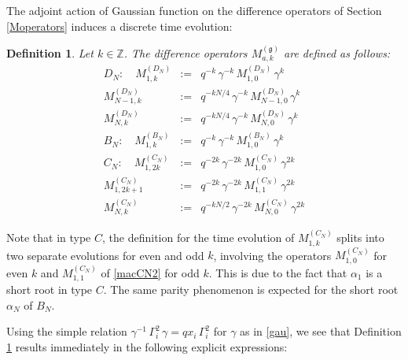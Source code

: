 \documentclass[12pt]{amsart}
\newtheorem{defn}[thm]{Definition}
\newcommand{\g}{{\mathfrak{g}}}
\newcommand{\Z}{{\mathbb Z}}
\newcommand{\al}{{\alpha}}
\numberwithin{equation}{section}
\numberwithin{table}{section}
\begin{document}
The adjoint action of Gaussian function on the difference operators of Section \ref{Moperators} induces a discrete time evolution:
\begin{defn}\label{discrete_time_evolution}
Let $k\in \Z$. The difference operators $M_{a,k}^{(\g)}$ are defined as follows:
\begin{eqnarray*}
D_N:\quad {M}_{1,k}^{(D_N)}&:=&q^{-k}\, \gamma^{-k}\, M_{1,0}^{(D_N)} \, \gamma^k \\
{M}_{N-1,k}^{(D_N)}&:=&q^{-kN/4}\, \gamma^{-k}\, {M}_{N-1,0}^{(D_N)} \, \gamma^k\\
{M}_{N,k}^{(D_N)}&:=&q^{-kN/4}\, \gamma^{-k}\, {M}_{N,0}^{(D_N)} \, \gamma^k\\
B_N:\quad  {M}_{1,k}^{(B_N)}&:=&q^{-k}\, \gamma^{-k}\, {M}_{1,0}^{(B_N)} \, \gamma^k \\
C_N:\quad {M}_{1,2k}^{(C_N)}&:=&q^{-2k}\, \gamma^{-2k}\,{M}_{1,0}^{(C_N)}\,\gamma^{2k}\\
{M}_{1,2k+1}^{(C_N)}&:=&q^{-2k}\, \gamma^{-2k}\,M_{1,1}^{(C_N)}\,\gamma^{2k}\\
{M}_{N,k}^{(C_N)}&:=& q^{-kN/2}\, \gamma^{-2k}\, {M}_{N,0}^{(C_N)}\, \gamma^{2k }
\end{eqnarray*}
\end{defn}
Note that in type $C$, the 
definition for the time evolution of $M_{1,k}^{(C_N)}$ splits into two separate evolutions for even and odd $k$,
involving the operators $M_{1,0}^{(C_N)}$ for even $k$ and $M_{1,1}^{(C_N)}$ of \eqref{macCN2} for odd $k$.
This is due to the fact that $\al_1$ is a short root in type $C$. The same parity phenomenon is expected for the
short root $\al_N$ of $B_N$.

Using the simple relation $\gamma^{-1}\,\Gamma_i^2\, \gamma= q x_i \, \Gamma_i^2$ for $\gamma$ as in \eqref{gau}, we see that Definition \ref{discrete_time_evolution} results immediately in the following explicit expressions: 
\end{document}
